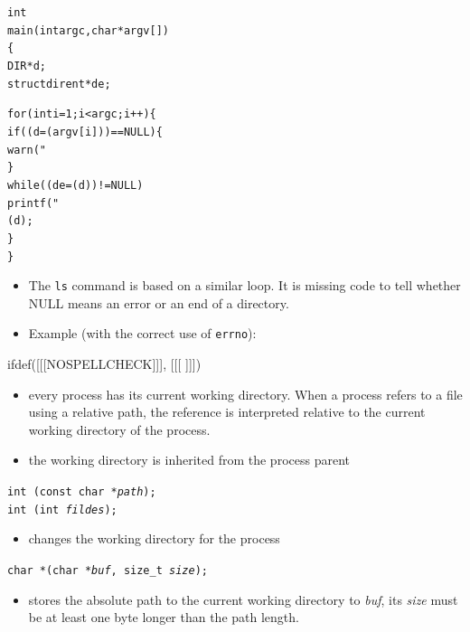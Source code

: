 
\begin{slide}
\begin{alltt}
int
main(int argc, char *argv[])
\{
    DIR *d;
    struct dirent *de;

    for (int i = 1; i < argc; i++) \{
        if ((d = (argv[i])) == NULL) \{
                warn("%
        \}
        while ((de = (d)) != NULL)
            printf("%
        (d);
    \}
\}
\end{alltt}
\end{slide}

\begin{itemize}
\item The \texttt{ls} command is based on a similar loop.  It is missing code to
tell whether NULL means an error or an end of a directory.
\item Example (with the correct use of \texttt{errno}):
\end{itemize}


ifdef([[[NOSPELLCHECK]]], [[[
]]])

\begin{slide}
\begin{itemize}
\item every process has its current working directory.  When a process refers to
a file using a relative path, the reference is interpreted relative to the
current working directory of the process.
\item the working directory is inherited from the process parent
\end{itemize}
\texttt{int (const char *\emph{path});}\\
\texttt{int (int \emph{fildes});}
\begin{itemize}
\item changes the working directory for the process
\end{itemize}
\texttt{char *(char *\emph{buf}, size\_t \emph{size});}
\begin{itemize}
\item stores the absolute path to the current working directory to \emph{buf},
its \emph{size} must be at least one byte longer than the path length.
\end{itemize}
\end{slide}

